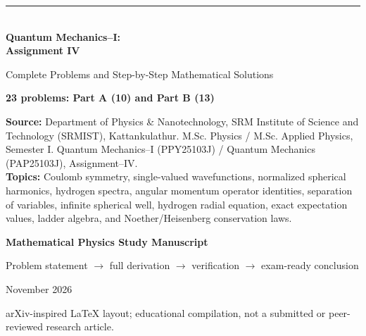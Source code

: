 \documentclass[11pt,a4paper]{article}
\begin{document}
\begin{titlepage}
\thispagestyle{empty}
\vspace*{14mm}
{\color{teal}\rule{\textwidth}{1.5pt}}\\[11mm]
{\sffamily\fontsize{29}{34}\selectfont\bfseries Quantum Mechanics--I:\\[2mm] Assignment IV}\par
\vspace{7mm}
{\sffamily\Large Complete Problems and Step-by-Step Mathematical Solutions}\par
\vspace{10mm}
{\large\bfseries 23 problems: Part A (10) and Part B (13)}\par
\vspace{8mm}
\begin{tcolorbox}[colback=pale,colframe=teal]
\textbf{Source:} Department of Physics \& Nanotechnology, SRM Institute of Science and Technology (SRMIST), Kattankulathur. M.Sc. Physics / M.Sc. Applied Physics, Semester I. Quantum Mechanics--I (PPY25103J) / Quantum Mechanics (PAP25103J), Assignment--IV.\\[4pt]
\textbf{Topics:} Coulomb symmetry, single-valued wavefunctions, normalized spherical harmonics, hydrogen spectra, angular momentum operator identities, separation of variables, infinite spherical well, hydrogen radial equation, exact expectation values, ladder algebra, and Noether/Heisenberg conservation laws.
\end{tcolorbox}
\vspace{10mm}
{\Large\bfseries\color{navy} Mathematical Physics Study Manuscript}\par
\vspace{4mm}
{\normalsize Problem statement \(\longrightarrow\) full derivation \(\longrightarrow\) verification \(\longrightarrow\) exam-ready conclusion}\par
\vfill
{\large November 2026}\par\vspace{4mm}
{\small arXiv-inspired \LaTeX{} layout; educational compilation, not a submitted or peer-reviewed research article.}\par
\vspace{9mm}{\color{teal}\rule{\textwidth}{1.5pt}}
\end{titlepage}
\end{document}
